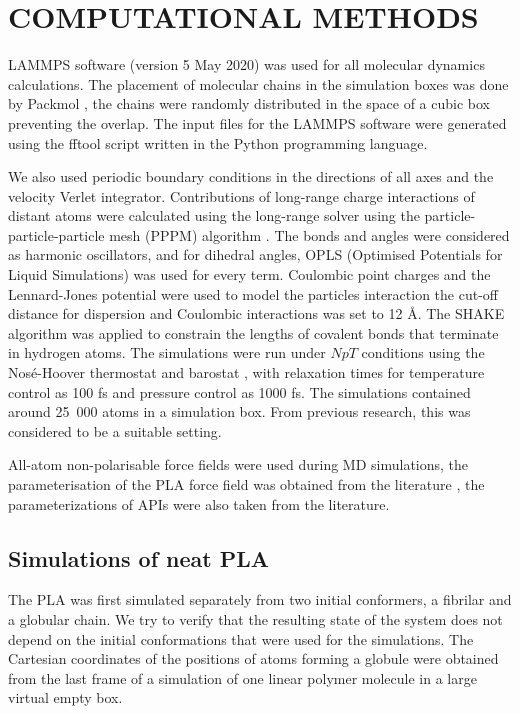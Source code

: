 \newpage
\section{COMPUTATIONAL METHODS}


LAMMPS software \cite{thompson_lammps_2022} (version 5 May 2020) was used for all molecular dynamics calculations. The placement of molecular chains in the simulation boxes was done by Packmol \cite{martinez_p_2009}, the chains were randomly distributed in the space of a cubic box preventing the  overlap. The input files for the LAMMPS software were generated using the fftool \cite{fftool} script written in the Python programming language.

We also used periodic boundary conditions in the directions of all axes and the velocity Verlet integrator. Contributions of long-range charge interactions of distant atoms were calculated using the long-range solver using the particle-particle-particle mesh (PPPM) algorithm \cite{hockney_computer_2021}. The bonds and angles were considered as harmonic oscillators, and for dihedral angles, OPLS (Optimised Potentials for Liquid Simulations) was used for every term.  Coulombic point charges and the Lennard-Jones potential were used to model the particles interaction the cut-off distance for dispersion and Coulombic interactions was set to 12 \r{A}. The SHAKE algorithm \cite{ryckaert_numerical_1977} was applied to constrain the lengths of covalent bonds that terminate in hydrogen atoms. The simulations were run under $NpT$ conditions using the Nosé-Hoover thermostat and barostat \cite{tuckerman_liouville-operator_2006}, with relaxation times for temperature control as 100 fs and pressure control as 1000 fs. The simulations contained around 25~000 atoms in a simulation box. From previous research, this was considered to be a suitable setting. \cite{klajmon_glass_2023}

All-atom non-polarisable force fields were used during MD simulations, the parameterisation of the PLA force field was obtained from the literature \cite{mcaliley_development_2011}, the parameterizations of APIs were also taken from the literature. \cite{cervinka_structure_2021}

\vspace{-0.2cm}
\subsection{Simulations of neat PLA}
The PLA was first simulated separately from two initial conformers, a fibrilar and a globular chain. We try to verify that the resulting state of the system does not depend on the initial conformations that were used for the simulations. The Cartesian coordinates of the positions of atoms forming a globule were obtained from the last frame of a simulation of one linear polymer molecule in a large virtual empty box.


